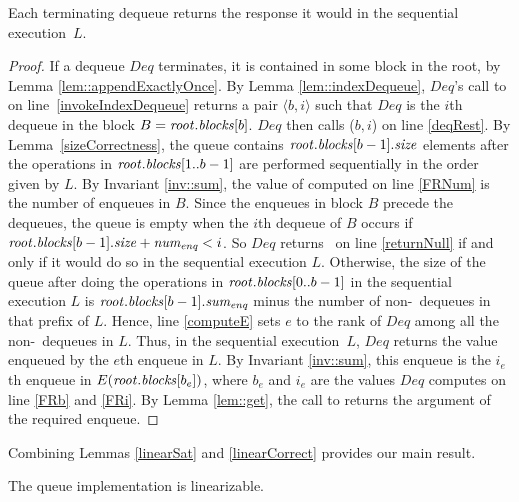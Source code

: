 \begin{lemma}\label{linearCorrect}
Each terminating dequeue returns the response it would in the sequential execution~$L$.
\end{lemma}
\begin{proof}
If a dequeue $Deq$ terminates, it is contained in some block in the root, by Lemma \ref{lem::appendExactlyOnce}.
By Lemma \ref{lem::indexDequeue}, $Deq$'s call to  on line~\ref{invokeIndexDequeue}
returns a pair $\langle b,i\rangle$ such that $Deq$ is the $i$th dequeue in the block 
$B=\mbox{\textnormal{\textit{root}}}.\mbox{\textit{blocks}}[b]$.
$Deq$ then calls ($b,i$) on line \ref{deqRest}.
By Lemma~\ref{sizeCorrectness}, the queue contains $\mbox{\textnormal{\textit{root}}}.\mbox{\textit{blocks}}[b-1].\mbox{\textit{size}}$ elements
after the operations in $\mbox{\textnormal{\textit{root}}}.\mbox{\textit{blocks}}[1..b-1]$ are performed sequentially 
in the order given by $L$.
By Invariant \ref{inv::sum}, the value of  computed on line \ref{FRNum}
is the number of enqueues in $B$.
Since the enqueues in block $B$ precede the dequeues,
the queue is empty when the $i$th dequeue of $B$ occurs if 
$\mbox{\textnormal{\textit{root}}}.\mbox{\textit{blocks}}[b-1].\mbox{\textit{size}} + \mbox{\textnormal{\textit{num\textsubscript{enq}}}} < i$.
So $Deq$ returns \nl\ on line \ref{returnNull} if and only if it would do so in the sequential
execution $L$.
Otherwise, the size of the queue after doing the operations in $\mbox{\textnormal{\textit{root}}}.\mbox{\textit{blocks}}[0..b-1]$
in the sequential execution $L$ is $\mbox{\textnormal{\textit{root}}}.\mbox{\textit{blocks}}[b-1].\mbox{\textit{sum\textsubscript{enq}}}$ minus
the number of non-\nl\ dequeues in that prefix of $L$.
Hence, line \ref{computeE} sets $e$ to the rank of $Deq$ among all the non-\nl\ dequeues in $L$.
Thus, in the sequential execution~$L$, $Deq$ returns the value enqueued by the $e$th enqueue in $L$.
By Invariant \ref{inv::sum}, this enqueue is the $i_e$th enqueue 
in $E(\mbox{\textnormal{\textit{root}}}.\mbox{\textit{blocks}}[b_e])$, where
$b_e$ and $i_e$ are the values $Deq$ computes on line \ref{FRb} and \ref{FRi}.
By Lemma \ref{lem::get}, the call to  returns the argument of the required enqueue.
\end{proof}

Combining Lemmas \ref{linearSat} and \ref{linearCorrect} provides our main result.

\begin{mytheorem}
The queue implementation is linearizable.
\end{mytheorem}



